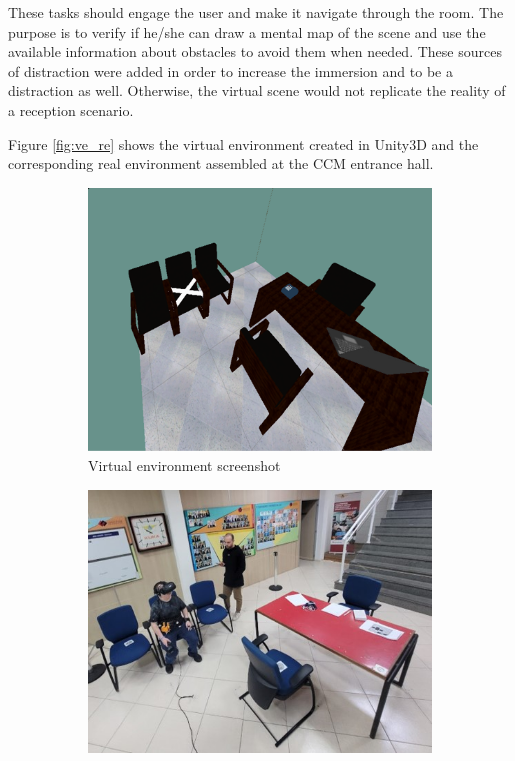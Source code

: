         
        
        These tasks should engage the user and make it navigate through the room. The purpose is to verify if he/she can draw a mental map of the scene and use the available information about obstacles to avoid them when needed. These sources of distraction were added in order to increase the immersion and to be a distraction as well. Otherwise, the virtual scene would not replicate the reality of a reception scenario.

        Figure \ref{fig:ve_re} shows the virtual environment created in Unity3D and the corresponding real environment assembled at the CCM entrance hall. 
    
        \begin{figure}[!htb]
            \centering
            \begin{subfigure}[b]{0.49\textwidth}
                \centering
                \includegraphics[width=\textwidth]{Metodologia/VE.png}
                \caption{Virtual environment screenshot}
                \label{fig:ve_photo}
            \end{subfigure}
            \hfill
            \begin{subfigure}[b]{0.49\textwidth}
                \centering
                \includegraphics[width=\textwidth]{Metodologia/RE.jpg}

\end{subfigure}
\end{figure}
